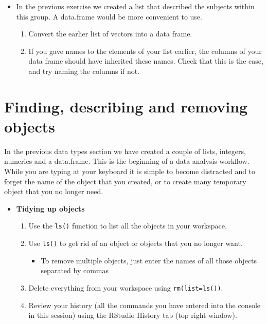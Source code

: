 \documentclass[a4paper]{book}
\providecommand{\tightlist}{%
  \setlength{\itemsep}{0pt}\setlength{\parskip}{0pt}}
\newenvironment{rmdblock}[1]
  {\vspace{1.5em}\begin{shaded*}
  \begin{itemize}
  \renewcommand{\labelitemi}{
    \raisebox{-.7\height}[0pt][0pt]{
      {\setkeys{Gin}{width=3em,keepaspectratio}\texttt{[image: images/\#1]}}
    }
  }
  \item
  }
  {
  \end{itemize}
  \end{shaded*}
  }
\newenvironment{rmdexercise}
  {\begin{rmdblock}{exercise}}
  {\end{rmdblock}}
\begin{document}
\begin{rmdexercise}
In the previous exercise we created a list that described the subjects
within this group. A data.frame would be more convenient to use.

\begin{enumerate}
\def\labelenumi{\arabic{enumi}.}
\setcounter{enumi}{1}
\item
  Convert the earlier list of vectors into a data frame.
\item
  If you gave names to the elements of your list earlier, the columns of
  your data frame should have inherited these names. Check that this is
  the case, and try naming the columns if not.
\end{enumerate}
\end{rmdexercise}

\section{Finding, describing and removing
objects}\label{finding-describing-and-removing-objects}

In the previous data types section we have created a couple of lists,
integers, numerics and a data.frame. This is the beginning of a data
analysis workflow. While you are typing at your keyboard it is simple to
become distracted and to forget the name of the object that you created,
or to create many temporary object that you no longer need.

\begin{rmdexercise}
\textbf{Tidying up objects}

\begin{enumerate}
\def\labelenumi{\arabic{enumi}.}
\item
  Use the \texttt{ls()} function to list all the objects in your
  workspace.
\item
  Use \texttt{ls()} to get rid of an object or objects that you no
  longer want.

  \begin{itemize}
  \tightlist
  \item
    To remove multiple objects, just enter the names of all those
    objects separated by commas
  \end{itemize}
\item
  Delete everything from your workspace using \texttt{rm(list=ls())}.
\item
  Review your history (all the commands you have entered into the
  console in this session) using the RStudio History tab (top right
  window).
\end{enumerate}
\end{rmdexercise}
\end{document}
